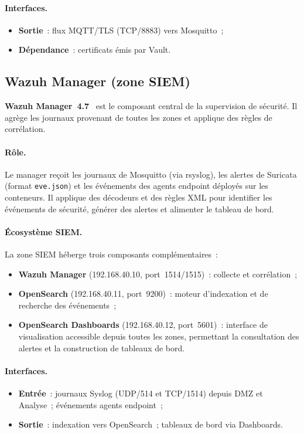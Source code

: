 \paragraph{Interfaces.}
\begin{itemize}[leftmargin=*]
  \item \textbf{Sortie}~: flux MQTT/TLS (TCP/8883) vers Mosquitto~;
  \item \textbf{Dépendance}~: certificats émis par Vault.
\end{itemize}

\subsection{Wazuh Manager (zone SIEM)}
\label{subsec:env-wazuh}

\textbf{Wazuh Manager~4.7}~\cite{wazuh_docs} est le composant central de la supervision de sécurité. Il agrège les journaux provenant de toutes les zones et applique des règles de corrélation.

\paragraph{Rôle.}
Le manager reçoit les journaux de Mosquitto (via rsyslog), les alertes de Suricata (format \texttt{eve.json}) et les événements des agents endpoint déployés sur les conteneurs. Il applique des décodeurs et des règles XML pour identifier les événements de sécurité, générer des alertes et alimenter le tableau de bord.

\paragraph{Écosystème SIEM.}
La zone SIEM héberge trois composants complémentaires~:
\begin{itemize}[leftmargin=*]
  \item \textbf{Wazuh Manager} (192.168.40.10, port~1514/1515)~: collecte et corrélation~;
  \item \textbf{OpenSearch} (192.168.40.11, port~9200)~: moteur d'indexation et de recherche des événements~;
  \item \textbf{OpenSearch Dashboards} (192.168.40.12, port~5601)~: interface de visualisation accessible depuis toutes les zones, permettant la consultation des alertes et la construction de tableaux de bord.
\end{itemize}

\paragraph{Interfaces.}
\begin{itemize}[leftmargin=*]
  \item \textbf{Entrée}~: journaux Syslog (UDP/514 et TCP/1514) depuis DMZ et Analyse~; événements agents endpoint~;
  \item \textbf{Sortie}~: indexation vers OpenSearch~; tableaux de bord via Dashboards.
\end{itemize}

